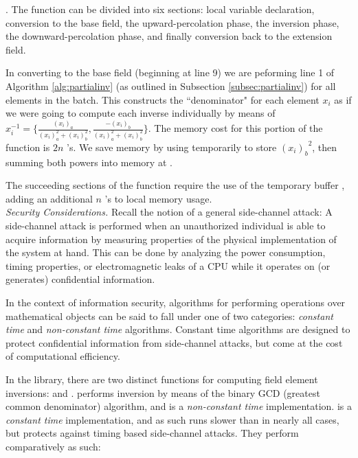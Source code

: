 \noindent
\pbinv. The \pbinv function can be divided into six sections: local variable declaration, conversion to the base field, the upward-percolation phase, the inversion phase, the downward-percolation phase, and finally conversion back to the extension field.

In converting to the base field (beginning at line 9) we are peforming line 1 of Algorithm \ref{alg:partialinv} (as outlined in Subsection \ref{subsec:partialinv}) for all elements in the batch. This constructs the ``denominator" for each element $x_i$ as if we were going to compute each inverse individually by means of $x_i^{-1} = \{\frac {(x_i)_{a}}{(x_i)_{a}^2 + (x_i)_{b}^2}, \frac {-(x_i)_{b}}{(x_i)_{a}^2 + (x_i)_{b}^2}\}$. The memory cost for this portion of the function is $2n$ 's. We save memory by using  temporarily to store ${(x_i)_{b}}^2$, then summing both powers into memory at .

The succeeding sections of the function require the use of the temporary buffer , adding an additional $n$ 's to local memory usage.
\\

\noindent
\emph{Security Considerations.} Recall the notion of a general side-channel attack: A side-channel attack is performed when an unauthorized individual is able to acquire information by measuring properties of the physical implementation of the system at hand. This can be done by analyzing the power consumption, timing properties, or electromagnetic leaks of a CPU while it operates on (or generates) confidential information.

In the context of information security, algorithms for performing operations over mathematical objects can be said to fall under one of two categories: \emph{constant time} and \emph{non-constant time} algorithms. Constant time algorithms are designed to protect confidential information from side-channel attacks, but come at the cost of computational efficiency.

In the \sidh library, there are two distinct functions for computing field element inversions:  and .  performs inversion by means of the binary GCD (greatest common denominator) algorithm, and is a \emph{non-constant time} implementation.  is a \emph{constant time} implementation, and as such runs slower than  in nearly all cases, but protects against timing based side-channel attacks. They perform comparatively as such:

